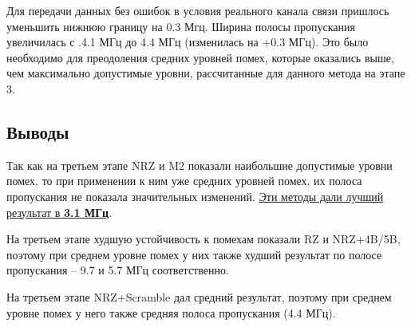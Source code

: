 Для передачи данных без ошибок в условия реального канала связи пришлось уменьшить нижнюю границу на 0.3 Мгц. Ширина полосы пропускания увеличилась с .4.1 МГц до 4.4 МГц (изменилась на +0.3 МГц). Это было необходимо для преодоления средних уровней помех, которые оказались выше, чем максимально допустимые уровни, рассчитанные для данного метода на этапе 3.

\subsection{Выводы}

Так как на третьем этапе NRZ и M2 показали наибольшие допустимые уровни помех, то при применении к ним уже средних уровней помех, их полоса пропускания не показала значительных изменений. \underline{Эти методы дали лучший} \underline{результат в \textbf{3.1 МГц}}.

На третьем этапе худшую устойчивость к помехам показали RZ и NRZ+4B/5B, поэтому при среднем уровне помех у них также худший результат по полосе пропускания – 9.7 и 5.7 МГц соответственно.

На третьем этапе NRZ+Scramble дал средний результат, поэтому при среднем уровне помех у него также средняя полоса пропускания (4.4 МГц).

